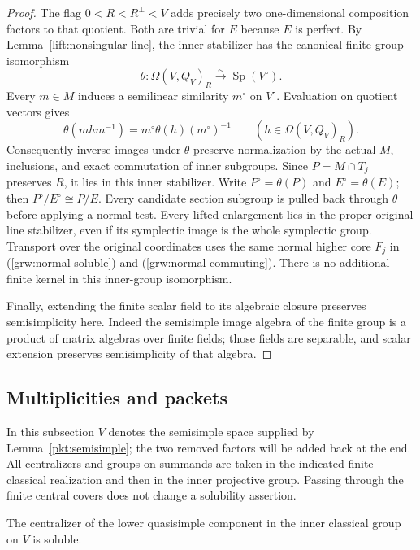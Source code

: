 \begin{proof}
The flag $0<R<R^\perp<V$ adds precisely two one-dimensional
composition factors to that quotient.  Both are trivial for $E$
because $E$ is perfect.  By Lemma~\ref{lift:nonsingular-line},
the inner stabilizer has the canonical finite-group isomorphism
\[
 \theta:\Omega(V,Q_V)_R\xrightarrow{\sim}
                    \operatorname{Sp}(V^\circ).
\]
Every $m\in M$ induces a semilinear similarity $m^\circ$ on
$V^\circ$.  Evaluation on quotient vectors gives
\[
 \theta(mhm^{-1})=
       m^\circ\theta(h)(m^\circ)^{-1}
       \qquad(h\in\Omega(V,Q_V)_R).
\]
Consequently inverse images under $\theta$ preserve normalization
by the actual $M$, inclusions, and exact commutation of inner
subgroups.  Since $P=M\cap T_j$ preserves $R$, it lies in this
inner stabilizer.  Write $P^\circ=\theta(P)$ and
$E^\circ=\theta(E)$; then $P^\circ/E^\circ\cong P/E$.
Every candidate section subgroup is pulled back through
$\theta$ before applying a normal test.  Every lifted enlargement
lies in the proper original line stabilizer, even if its
symplectic image is the whole symplectic group.  Transport over
the original coordinates uses the same normal higher core
$F_j$ in \textup{(\ref{grw:normal-soluble})} and \textup{(\ref{grw:normal-commuting})}.  There is no additional
finite kernel in this inner-group isomorphism.

Finally, extending the finite scalar field to its algebraic
closure preserves semisimplicity here.  Indeed the semisimple
image algebra of the finite group is a product of matrix
algebras over finite fields; those fields are separable, and
scalar extension preserves semisimplicity of that algebra.
\end{proof}

\subsection{Multiplicities and packets}

In this subsection $V$ denotes the semisimple space supplied by
Lemma~\ref{pkt:semisimple}; the two removed factors will be added
back at the end.  All centralizers and groups on summands are
taken in the indicated finite classical realization and then in
the inner projective group.  Passing through the finite central
covers does not change a solubility assertion.

\begin{lemma}
\label{pkt:centralizer}
The centralizer of the lower quasisimple component in the inner
classical group on $V$ is soluble.
\end{lemma}

